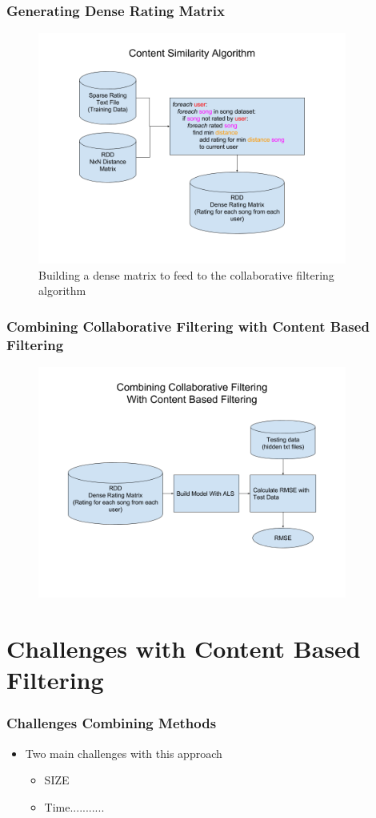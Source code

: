\documentclass[11pt]{beamer}
\begin{document}
  \begin{frame}
    \frametitle{Generating Dense Rating Matrix}
    \begin{figure}[h]
      \centering
      \includegraphics[width=4in]{figures/content_similarity_algorithm.png}
      \caption{Building a dense matrix to feed to the collaborative filtering algorithm}
      \label{fig:content_similarity_algorithm}
    \end{figure}
  \end{frame}

  \begin{frame}
    \frametitle{Combining Collaborative Filtering with Content Based Filtering}
    \begin{figure}[h]
      \centering
      \includegraphics[width=4in]{figures/collab_plus_content.png}
      \label{fig:collab_plus_content.png}
    \end{figure}
  \end{frame}


  \section{Challenges with Content Based Filtering}
  \begin{frame}
    \frametitle{Challenges Combining Methods}
    \begin{itemize}
      \item Two main challenges with this approach
        \begin{itemize}
          \item SIZE
          \item Time...........
        \end{itemize}
    \end{itemize}
  \end{frame}
\end{document}
